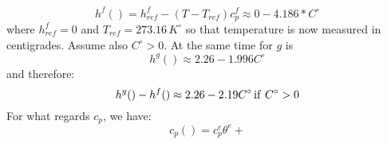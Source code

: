 \begin{equation}
h^f() = h^f_{ref} -(T-T_{ref})c_p^f \approx 0 - 4.186*  C^\circ   
\end{equation}
where \(h_{ref}^f=0\) and \(T_{ref} = 273.16\, K^\circ\) so that temperature is now measured in centigrades. Assume also \(C^\circ >0 \).
At the same time for \(g\) is 
\begin{equation}
h^g( ) \approx 2.26  - 1.996 C^\circ
\end{equation}
and therefore:
\begin{equation}
h^g()-h^f() \approx 2.26 - 2.19 C^\circ \, {\rm if}\ C^\circ > 0
\end{equation}
For what regards \( c_p\), we have:
\begin{equation}
c_p() = c_p^e \theta^e + 
\end{equation}